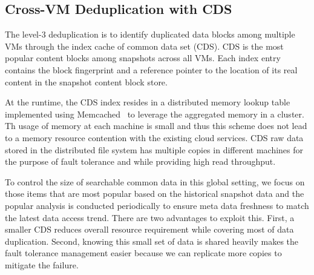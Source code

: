 \subsection{Cross-VM Deduplication with CDS}
\label{sect:crossVM}

The level-3 deduplication is to identify duplicated data blocks among multiple VMs through the index cache
of common data set (CDS).  CDS is the most popular content blocks 
among snapshots across all VMs. 
Each index entry contains  the block fingerprint and a reference pointer to the location of its real content
in the snapshot content block store.

At the runtime, the CDS index resides in a distributed  memory lookup table  
implemented using Memcached~\cite{memcached} to leverage the aggregated memory in a cluster.
Th usage of memory at each machine is small and thus  this scheme  does not
lead to  a memory resource contention with the existing cloud services.
CDS raw data stored  in the distributed file system
has multiple copies in different machines for the purpose of fault tolerance and 
while providing high read throughput.  



To control the size of searchable common data in this global setting, we focus on those items that 
are most popular based on the historical snapshot data and the popular analysis is conducted periodically to ensure 
meta data freshness to match the latest data access trend.
There are two advantages to exploit this.
First, a smaller CDS reduces overall resource requirement while covering most of data duplication.
Second, knowing this small set of data is shared heavily makes the fault tolerance management 
easier because we can replicate more copies to mitigate the failure.

